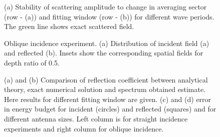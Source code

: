 \begin{figure}
	\centering
	\caption{(a) Stability of scattering amplitude to change in averaging sector (row - (a)) and 
		fitting window (row - (b)) for different wave periods. The green line shows exact scattered 
		field.}
\end{figure}

\begin{figure}
	\centering
	\caption{Oblique incidence experiment. (a) Distribution of incident field (a) and reflected 
		(b). Insets show the corresponding spatial fields for depth ratio of 0.5.}
\end{figure}

\begin{figure}
	\centering
	\caption{(a) and (b) Comparison of reflection coefficient between analytical theory, exact 
		numerical solution and spectrum obtained estimate. Here results for different fitting 
		window 
		are given. (c) and (d) error in energy budget for incident (circles) and reflected 
		(squares) 
		and for different antenna sizes. Left column is for straight incidence experiments and 
		right 
		column for oblique incidence.}
\end{figure}





